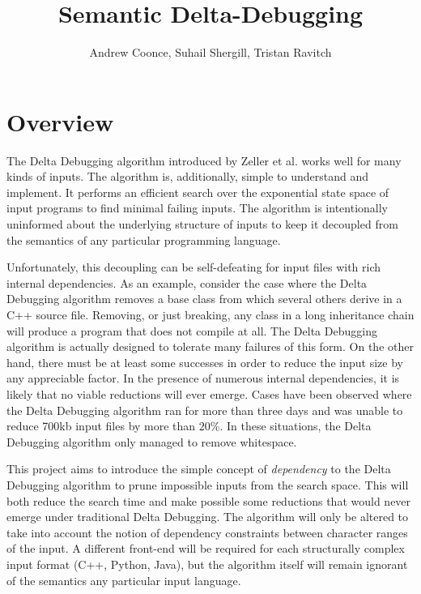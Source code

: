 \documentclass[11pt]{article}
\title{Semantic Delta-Debugging}
\author{
Andrew Coonce, Suhail Shergill, Tristan Ravitch\\
\email{\{coonce, shergill, travitch\}@cs.wisc.edu}
}
\begin{document}
\setlength{\pdfpageheight}{\paperheight}
\setlength{\pdfpagewidth}{\paperwidth}
\maketitle

\section{Overview}
The Delta Debugging algorithm introduced by Zeller et al. \cite{dd} works well
for many kinds of inputs. The algorithm is, additionally, simple to understand
and implement. It performs an efficient search over the exponential state space
of input programs to find minimal failing inputs. The algorithm is intentionally
uninformed about the underlying structure of inputs to keep it decoupled from
the semantics of any particular programming language.

Unfortunately, this decoupling can be self-defeating for input files with rich
internal dependencies. As an example, consider the case where the Delta
Debugging algorithm removes a base class from which several others derive in a
C++ source file. Removing, or just breaking, any class in a long inheritance
chain will produce a program that does not compile at all. The Delta Debugging
algorithm is actually designed to tolerate many failures of this form. On the
other hand, there must be at least some successes in order to reduce the input
size by any appreciable factor. In the presence of numerous internal
dependencies, it is likely that no viable reductions will ever emerge. Cases
have been observed where the Delta Debugging algorithm ran for more than three
days and was unable to reduce 700kb input files by more than $20 \%$. In these
situations, the Delta Debugging algorithm only managed to remove whitespace.

This project aims to introduce the simple concept of \emph{dependency} to the
Delta Debugging algorithm to prune impossible inputs from the search space.
This will both reduce the search time and make possible some reductions that
would never emerge under traditional Delta Debugging. The algorithm will only be
altered to take into account the notion of dependency constraints between
character ranges of the input. A different front-end will be required for each
structurally complex input format (C++, Python, Java), but the algorithm itself
will remain ignorant of the semantics any particular input language.
\end{document}
